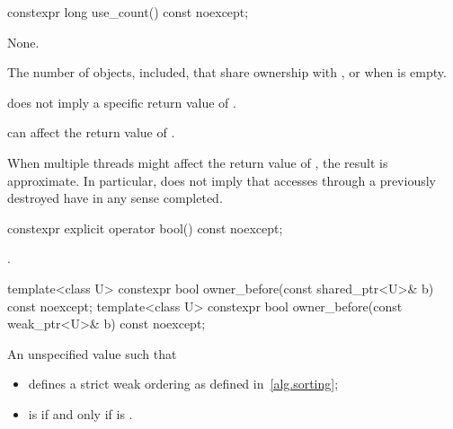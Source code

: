 %
\begin{itemdecl}
constexpr long use_count() const noexcept;
\end{itemdecl}

\begin{itemdescr}
\pnum
\sync
None.

\pnum
\returns
The number of  objects,  included,
that share ownership with , or  when  is
empty.

\pnum
\begin{note}
does not imply a specific return value of .
\end{note}

\pnum
\begin{note}
can affect the return value of .
\end{note}

\pnum
\begin{note}
When multiple threads
might affect the return value of ,
the result is approximate.
In particular,  does not imply that accesses through
a previously destroyed  have in any sense completed.
\end{note}
\end{itemdescr}

%
\begin{itemdecl}
constexpr explicit operator bool() const noexcept;
\end{itemdecl}

\begin{itemdescr}
\pnum
\returns
{}.
\end{itemdescr}

%
\begin{itemdecl}
template<class U> constexpr bool owner_before(const shared_ptr<U>& b) const noexcept;
template<class U> constexpr bool owner_before(const weak_ptr<U>& b) const noexcept;
\end{itemdecl}

\begin{itemdescr}
\pnum
\returns
An unspecified value such that
\begin{itemize}
\item
{} defines a strict weak ordering as defined in~\ref{alg.sorting};
\item
{} is 
if and only if  is .
\end{itemize}
\end{itemdescr}

